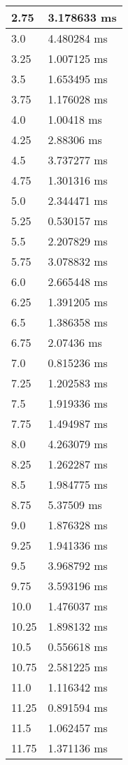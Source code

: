 \begin{multicols}{2}
\begin{tabular}{|l|l|}
		2.75 & 3.178633 ms \\ \hline
		3.0 & 4.480284 ms \\ \hline
		3.25 & 1.007125 ms \\ \hline
		3.5 & 1.653495 ms \\ \hline
		3.75 & 1.176028 ms \\ \hline
		4.0 & 1.00418 ms \\ \hline
		4.25 & 2.88306 ms \\ \hline
		4.5 & 3.737277 ms \\ \hline
		4.75 & 1.301316 ms \\ \hline
		5.0 & 2.344471 ms \\ \hline
		5.25 & 0.530157 ms \\ \hline
		5.5 & 2.207829 ms \\ \hline
		5.75 & 3.078832 ms \\ \hline
		6.0 & 2.665448 ms \\ \hline
		6.25 & 1.391205 ms \\ \hline
		6.5 & 1.386358 ms \\ \hline
		6.75 & 2.07436 ms \\ \hline
		7.0 & 0.815236 ms \\ \hline
		7.25 & 1.202583 ms \\ \hline
		7.5 & 1.919336 ms \\ \hline
		7.75 & 1.494987 ms \\ \hline
		8.0 & 4.263079 ms \\ \hline
		8.25 & 1.262287 ms \\ \hline
		8.5 & 1.984775 ms \\ \hline
		8.75 & 5.37509 ms \\ \hline
		9.0 & 1.876328 ms \\ \hline
		9.25 & 1.941336 ms \\ \hline
		9.5 & 3.968792 ms \\ \hline
		9.75 & 3.593196 ms \\ \hline
		10.0 & 1.476037 ms \\ \hline
		10.25 & 1.898132 ms \\ \hline
		10.5 & 0.556618 ms \\ \hline
		10.75 & 2.581225 ms \\ \hline
		11.0 & 1.116342 ms \\ \hline
		11.25 & 0.891594 ms \\ \hline
		11.5 & 1.062457 ms \\ \hline
		11.75 & 1.371136 ms \\ \hline

\end{tabular}
\end{multicols}
